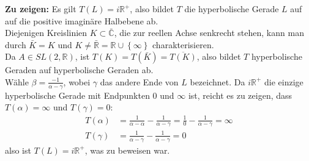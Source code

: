\begin{problem}[3b]
  \textbf{Zu zeigen:} Es gilt \( T(L) = i \mathbb{R}^{+} \), also bildet \( T \) die hyperbolische Gerade \( L \) auf auf die positive imaginäre Halbebene ab. \\
  Diejenigen Kreislinien \( K \subset \bar{\mathbb{C}} \), die zur reellen Achse senkrecht stehen, kann man durch \( \bar{K} = K \) und \( K \neq \bar{\mathbb{R}} = \mathbb{R} \cup \left \{ \infty \right \} \) charakterisieren. \\
  Da \( A \in SL(2, \mathbb{R}) \), ist \( T(K) = T(\bar{K}) = \overline{T(K)} \), also bildet \( T \) hyperbolische Geraden auf hyperbolische Geraden ab. \\
  Wähle \( \beta = \frac{-1}{\alpha - \gamma} \), wobei \( \gamma \) das andere Ende von \( L \) bezeichnet. Da \( i \mathbb{R}^{+} \) die einzige hyperbolische Gerade mit Endpunkten \( 0 \) und \( \infty \) ist, reicht es zu zeigen, dass \( T(\alpha) = \infty \) und \( T(\gamma) = 0 \): \\
  \begin{align*}
    T(\alpha) &= \frac{1}{\alpha - \alpha} - \frac{1}{\alpha - \gamma} = \frac{1}{0} - \frac{1}{\alpha - \gamma} = \infty \\
    T(\gamma) &= \frac{1}{\alpha - \gamma} - \frac{1}{\alpha - \gamma} = 0 
  \end{align*}
  also ist \( T(L) = i \mathbb{R}^{+} \), was zu beweisen war.
\end{problem}
